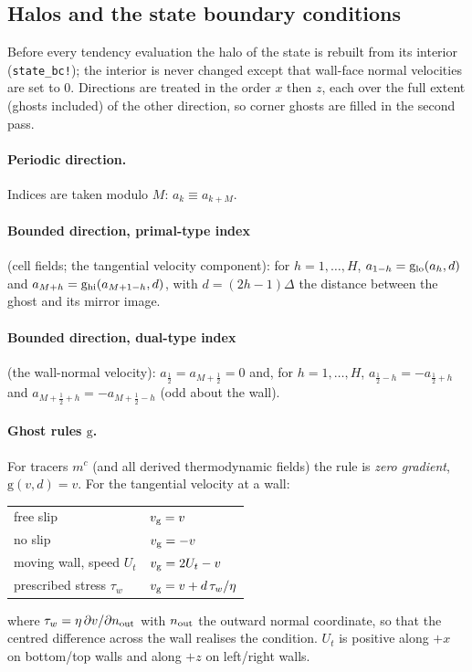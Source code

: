\documentclass[11pt,a4paper]{article}
\newcommand{\code}[1]{\texttt{#1}}
\begin{document}
\subsection{Halos and the state boundary conditions}\label{sec:halo}
Before every tendency evaluation the halo of the state is rebuilt from its interior (\code{state\_bc!}); the interior is never changed except that wall-face normal velocities are set to $0$.
Directions are treated in the order $x$ then $z$, each over the full extent (ghosts included) of the other direction, so corner ghosts are filled in the second pass.
\paragraph{Periodic direction.} Indices are taken modulo $M$: $a_{k}\equiv a_{k+M}$.
\paragraph{Bounded direction, primal-type index} (cell fields; the tangential velocity component): for $h=1,\dots,H$,
$a_{1-h}=\mathrm{g}_{\rm lo}(a_h,d)$ and $a_{M+h}=\mathrm{g}_{\rm hi}(a_{M+1-h},d)$, with $d=(2h-1)\Delta$ the distance between the ghost and its mirror image.
\paragraph{Bounded direction, dual-type index} (the wall-normal velocity): $a_{\frac12}=a_{M+\frac12}=0$ and, for $h=1,\dots,H$, $a_{\frac12-h}=-a_{\frac12+h}$ and $a_{M+\frac12+h}=-a_{M+\frac12-h}$ (odd about the wall).
\paragraph{Ghost rules $\mathrm g$.} For tracers $m^c$ (and all derived thermodynamic fields) the rule is \emph{zero gradient}, $\mathrm g(v,d)=v$. For the tangential velocity at a wall:
\begin{center}\small
\begin{tabular}{ll}
\hline
free slip & $v_{\rm g}=v$\\
no slip & $v_{\rm g}=-v$\\
moving wall, speed $U_t$ & $v_{\rm g}=2U_t-v$\\
prescribed stress $\tau_w$ & $v_{\rm g}=v+d\,\tau_w/\eta$\\ \hline
\end{tabular}
\end{center}
where $\tau_w=\eta\,\partial v/\partial n_{\rm out}$ with $n_{\rm out}$ the outward normal coordinate, so that the centred difference across the wall realises the condition. $U_t$ is positive along $+x$ on bottom/top walls and along $+z$ on left/right walls.
\end{document}
